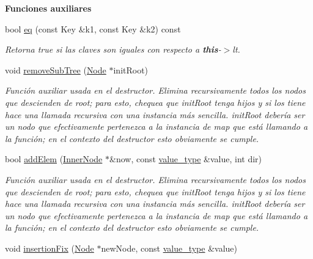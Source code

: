 \begin{Indent}{\bf Funciones auxiliares}\par
\begin{DoxyCompactItemize}
\item 
bool \hyperlink{classaed2_1_1map_ab45cb28bb215cd229383d88b96b3f624_ab45cb28bb215cd229383d88b96b3f624}{eq} (const Key \&k1, const Key \&k2) const 
\begin{DoxyCompactList}\small\item\em Retorna true si las claves son iguales con respecto a {\bfseries this}-\/$>$lt. \end{DoxyCompactList}\item 
void \hyperlink{classaed2_1_1map_a533bd88d0b7a584e3c968548d246c255_a533bd88d0b7a584e3c968548d246c255}{remove\-Sub\-Tree} (\hyperlink{structaed2_1_1map_1_1Node}{Node} $\ast$init\-Root)
\begin{DoxyCompactList}\small\item\em Función auxiliar usada en el destructor. Elimina recursivamente todos los nodos que descienden de root; para esto, chequea que init\-Root tenga hijos y si los tiene hace una llamada recursiva con una instancia más sencilla. init\-Root debería ser un nodo que efectivamente pertenezca a la instancia de map que está llamando a la función; en el contexto del destructor esto obviamente se cumple. \end{DoxyCompactList}\item 
bool \hyperlink{classaed2_1_1map_a010a17bb041f4b1dfc22246920cde9ee_a010a17bb041f4b1dfc22246920cde9ee}{add\-Elem} (\hyperlink{structaed2_1_1map_1_1InnerNode}{Inner\-Node} $\ast$\&now, const \hyperlink{classaed2_1_1map_a719db98e0ff9a837610f76be33264680_a719db98e0ff9a837610f76be33264680}{value\-\_\-type} \&value, int dir)
\begin{DoxyCompactList}\small\item\em Función auxiliar usada en el destructor. Elimina recursivamente todos los nodos que descienden de root; para esto, chequea que init\-Root tenga hijos y si los tiene hace una llamada recursiva con una instancia más sencilla. init\-Root debería ser un nodo que efectivamente pertenezca a la instancia de map que está llamando a la función; en el contexto del destructor esto obviamente se cumple. \end{DoxyCompactList}\item 
void \hyperlink{classaed2_1_1map_abe3f47a745e17a6327943b813ff6bfb3_abe3f47a745e17a6327943b813ff6bfb3}{insertion\-Fix} (\hyperlink{structaed2_1_1map_1_1Node}{Node} $\ast$new\-Node, const \hyperlink{classaed2_1_1map_a719db98e0ff9a837610f76be33264680_a719db98e0ff9a837610f76be33264680}{value\-\_\-type} \&value)

\end{DoxyCompactItemize}
\end{Indent}
